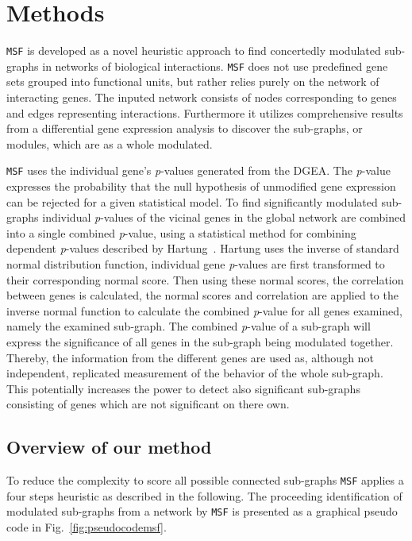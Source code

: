 \documentclass[10pt,a4paper,twocolumn]{article}
\begin{document}
\section*{Methods}
\texttt{MSF} is developed as a novel heuristic approach to
find concertedly modulated sub-graphs in networks of biological interactions.
\texttt{MSF} does not use predefined gene sets grouped into
functional units, but rather relies purely on the network of interacting genes.
The inputed network consists of nodes corresponding to genes and edges
representing interactions. Furthermore it utilizes comprehensive results from a
differential gene expression analysis to discover the sub-graphs, or modules, which
are as a whole modulated.

\texttt{MSF} uses the individual gene's \textit{p}-values generated
from the DGEA. The \textit{p}-value expresses the probability that the
null hypothesis of unmodified gene expression can be rejected for a
given statistical model. To find significantly modulated sub-graphs
individual \textit{p}-values of the vicinal genes in the global
network are combined into a single combined \textit{p}-value, using a
statistical method for combining dependent \textit{p}-values described
by Hartung~\cite{Hartung}. Hartung uses the inverse of standard normal
distribution function, individual gene \textit{p}-values are first
transformed to their corresponding normal score. Then using these
normal scores, the correlation between genes is calculated, the normal
scores and correlation are applied to the inverse normal function to
calculate the combined \textit{p}-value for all genes examined, namely the
examined sub-graph. The combined \textit{p}-value of a sub-graph will
express the significance of all genes in the sub-graph being modulated
together. Thereby, the information from the different genes are used as,
although not independent, replicated measurement of the behavior of the whole
sub-graph. This potentially increases the power to detect also significant
sub-graphs consisting of genes which are not significant on there own.
\newline

\subsection*{Overview of our method}

To reduce the complexity to score all possible connected sub-graphs
\texttt{MSF} applies a four steps heuristic as described in the
following. The proceeding identification of modulated sub-graphs from
a network by \texttt{MSF} is presented as a graphical pseudo code  in
Fig.~\ref{fig:pseudocodemsf}. 
\end{document}
